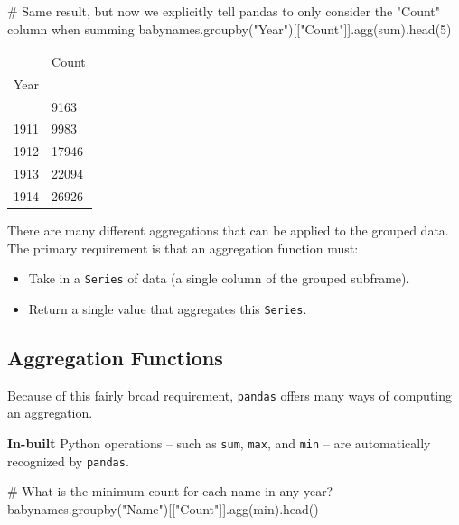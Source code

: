 \documentclass[
  letterpaper,
  DIV=11,
  numbers=noendperiod]{scrreprt}
\newenvironment{Shaded}{\begin{snugshade}}{\end{snugshade}}
\newcommand{\BuiltInTok}[1]{\textcolor[rgb]{0.00,0.23,0.31}{#1}}
\newcommand{\CommentTok}[1]{\textcolor[rgb]{0.37,0.37,0.37}{#1}}
\newcommand{\DecValTok}[1]{\textcolor[rgb]{0.68,0.00,0.00}{#1}}
\newcommand{\NormalTok}[1]{\textcolor[rgb]{0.00,0.23,0.31}{#1}}
\newcommand{\StringTok}[1]{\textcolor[rgb]{0.13,0.47,0.30}{#1}}
\providecommand{\tightlist}{%
  \setlength{\itemsep}{0pt}\setlength{\parskip}{0pt}}\usepackage{longtable,booktabs,array}
\begin{document}
\begin{Shaded}
\begin{Highlighting}[]
\CommentTok{\# Same result, but now we explicitly tell pandas to only consider the "Count" column when summing}
\NormalTok{babynames.groupby(}\StringTok{"Year"}\NormalTok{)[[}\StringTok{"Count"}\NormalTok{]].agg(}\BuiltInTok{sum}\NormalTok{).head(}\DecValTok{5}\NormalTok{)}
\end{Highlighting}
\end{Shaded}

\begin{longtable}[]{@{}ll@{}}
\toprule\noalign{}
& Count \\
Year & \\
\midrule\noalign{}
\endhead
\bottomrule\noalign{}
\endlastfoot
1910 & 9163 \\
1911 & 9983 \\
1912 & 17946 \\
1913 & 22094 \\
1914 & 26926 \\
\end{longtable}

There are many different aggregations that can be applied to the grouped
data. The primary requirement is that an aggregation function must:

\begin{itemize}
\tightlist
\item
  Take in a \texttt{Series} of data (a single column of the grouped
  subframe).
\item
  Return a single value that aggregates this \texttt{Series}.
\end{itemize}

\subsection{Aggregation Functions}\label{aggregation-functions}

Because of this fairly broad requirement, \texttt{pandas} offers many
ways of computing an aggregation.

\textbf{In-built} Python operations -- such as \texttt{sum},
\texttt{max}, and \texttt{min} -- are automatically recognized by
\texttt{pandas}.

\begin{Shaded}
\begin{Highlighting}[]
\CommentTok{\# What is the minimum count for each name in any year?}
\NormalTok{babynames.groupby(}\StringTok{"Name"}\NormalTok{)[[}\StringTok{"Count"}\NormalTok{]].agg(}\BuiltInTok{min}\NormalTok{).head()}
\end{Highlighting}
\end{Shaded}
\end{document}
